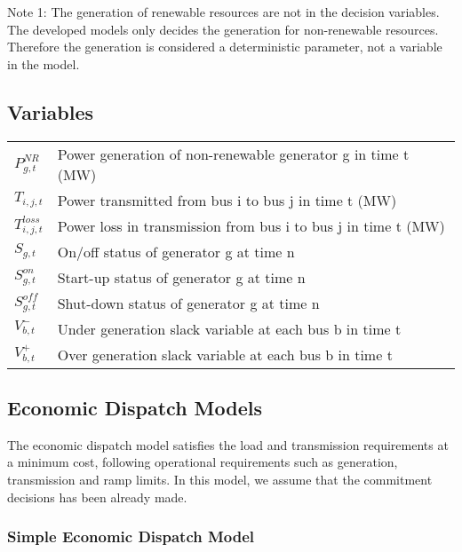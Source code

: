 \documentclass[12pt,LUDisStyle,twosided]{book}
\begin{document}
Note 1: The generation of renewable resources are not in the decision variables. The developed models only decides the generation for non-renewable resources. Therefore the generation is considered a deterministic parameter, not a variable in the model.

\subsection{Variables}

\begin{tabular}{ll}

$P^{NR}_{g,t} $& Power generation of non-renewable generator g in time t (MW)\\
$T_{i,j,t} $& Power transmitted from bus i to bus j in time t (MW)\\
$T^{loss}_{i,j,t} $& Power loss in transmission from bus i to bus j in time t (MW)\\
$S_{g,t} $& On/off status of generator g at time n\\
$S^{on}_{g,t} $& Start-up status of generator g at time n\\
$S^{off}_{g,t} $& Shut-down status of generator g at time n\\
$V^{-}_{b,t} $& Under generation slack variable at each bus b in time t\\
$V^{+}_{b,t} $& Over generation slack variable at each bus b in time t\\

\end{tabular}

\subsection{Economic Dispatch Models}

The economic dispatch model satisfies the load and transmission requirements at a minimum cost, following operational requirements such as generation, transmission and ramp limits. In this model, we assume that the commitment decisions has been already made.

\subsubsection{Simple Economic Dispatch Model}
\end{document}
